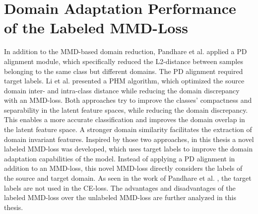 \section{Domain Adaptation Performance of the Labeled MMD-Loss}
In addition to the MMD-based domain reduction, Pandhare et al. \cite{Pandhare2021} applied a PD alignment module, which specifically reduced the L2-distance between samples belonging to the same class but different domains. The PD alignment required target labels. Li et al. \cite{Li2018} presented a PHM algorithm, which optimized the source domain inter- and intra-class distance while reducing the domain discrepancy with an MMD-loss. Both approaches try to improve the classes' compactness and separability in the latent feature spaces, while reducing the domain discrepancy. This enables a more accurate classification and improves the domain overlap in the latent feature space. A stronger domain similarity facilitates the extraction of domain invariant features. Inspired by those two approaches, in this thesis a novel labeled MMD-loss was developed, which uses target labels to improve the domain adaptation capabilities of the model. Instead of applying a PD alignment in addition to an MMD-loss, this novel MMD-loss directly considers the labels of the source and target domain. As seen in the work of Pandhare et al. \cite{Pandhare2021}, the target labels are not used in the CE-loss. The advantages and disadvantages of the labeled MMD-loss over the unlabeled MMD-loss are further analyzed in this thesis.

